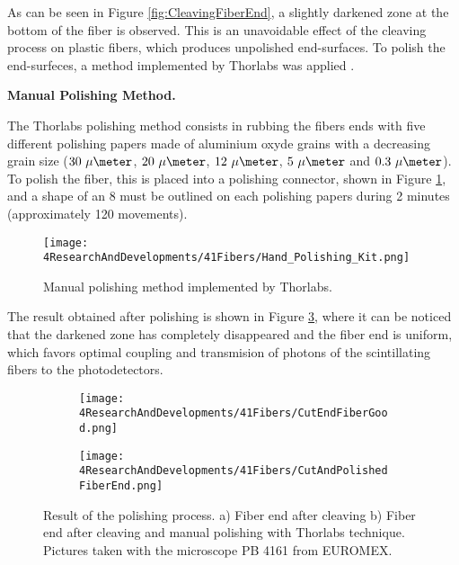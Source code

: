 As can be seen in Figure \ref{fig:CleavingFiberEnd}, a slightly darkened zone at the bottom of the fiber is observed. This is an unavoidable effect of the cleaving process on plastic fibers, which produces unpolished end-surfaces. To polish the end-surfeces, a method implemented by Thorlabs was applied \cite{DiamondThorlabs}. 

\textbf{Manual Polishing Method.}

The Thorlabs polishing method consists in rubbing the fibers ends with five different polishing papers made of aluminium oxyde grains with a decreasing grain size ($30~\mu\meter$, $20~\mu\meter$, $12~\mu\meter$, $5~\mu\meter$ and $0.3~\mu\meter$). To polish the fiber, this is placed into a polishing connector, shown in Figure \ref{fig:HandPolishingMethod}, and a shape of an 8 must be outlined on each polishing papers during 2 minutes (approximately 120 movements). 

\begin{figure}[h]
\centering
\texttt{[image: 4ResearchAndDevelopments/41Fibers/Hand\_Polishing\_Kit.png]}
\caption{Manual polishing method implemented by Thorlabs.\label{fig:HandPolishingMethod}}
\end{figure}
The result obtained after polishing is shown in Figure \ref{subfig:PolishFiberEnd}, where it can be noticed that the darkened zone has completely disappeared and the fiber end is uniform, which favors optimal coupling and transmision of photons of the scintillating fibers to the photodetectors.

\begin{figure}
\centering
    \begin{subfigure}[b]{0.5\textwidth}
    \centering
    \texttt{[image: 4ResearchAndDevelopments/41Fibers/CutEndFiberGood.png]}  
    \caption{\label{subfig:CleaveFiberEnd}}
    \end{subfigure}
    \hfill
    \begin{subfigure}[b]{0.45\textwidth}
    \centering
    \texttt{[image: 4ResearchAndDevelopments/41Fibers/CutAndPolishedFiberEnd.png]}  
    \caption{\label{subfig:PolishFiberEnd}}
    \end{subfigure}
 \caption{Result of the polishing process. a) Fiber end after cleaving b) Fiber end after cleaving and manual polishing with Thorlabs technique. Pictures taken with the microscope PB 4161 from EUROMEX.}
 \label{fig:ResultofPolishingProcess}
\end{figure}

